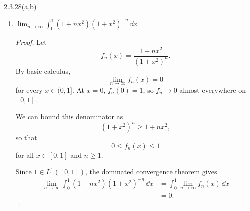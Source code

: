 \documentclass[11pt]{article}
\begin{document}
\begin{problem}{2.3.28(a,b)}
\begin{enumerate}[label=(\alph*)]
    \item \( \displaystyle\lim_{n\to\infty}
      \int_0^1(1+nx^2)(1+x^2)^{-n}\,\dd{x} \)

          \begin{proof}
            Let
            \begin{equation}
              \label{eq:p4-b-fn}
              f_n(x)=\frac{1+nx^2}{(1+x^2)^n}.
            \end{equation}
            By basic calculus,
            \begin{equation}
              \label{eq:p4-b-pointwise}
              \lim_{n\to\infty}f_n(x)=0
            \end{equation}
            for every \( x\in(0,1] \). At \( x=0 \), \( f_n(0)=1 \), so \( f_n\to 0 \) almost everywhere on \( [0,1] \).

            We can bound this denominator as
            \begin{equation}
              \label{eq:p4-b-bernoulli}
              (1+x^2)^n\geq 1+nx^2,
            \end{equation}
            so that
            \begin{equation}
              \label{eq:p4-b-domination}
              0\leq f_n(x)\leq 1
            \end{equation}
            for all \( x\in[0,1] \) and \( n\geq 1 \).

            Since \( 1\in L^1([0,1]) \), the dominated convergence theorem gives
            \begin{equation}
              \label{eq:p4-b-limit}
              \begin{aligned}
                \lim_{n\to\infty}
                \int_0^1(1+nx^2)(1+x^2)^{-n}\,\dd{x}
                &=\int_0^1\lim_{n\to\infty}f_n(x)\,\dd{x}\\
                &=0.
              \end{aligned}
            \end{equation}
          \end{proof}
  \end{enumerate}
\end{problem}
\end{document}
